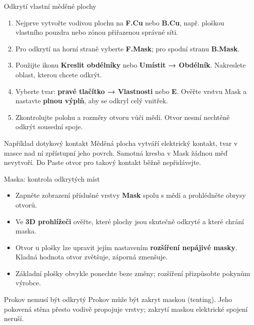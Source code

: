 \documentclass{beamer}
\begin{document}
\begin{frame}[t]{Odkrytí vlastní měděné plochy}
	\small
	\begin{enumerate}
		\item Nejprve vytvořte vodivou plochu na \textbf{F.Cu} nebo \textbf{B.Cu}, např. ploškou vlastního pouzdra nebo zónou přiřazenou správné síti.
		\item Pro odkrytí na horní straně vyberte \textbf{F.Mask}; pro spodní stranu \textbf{B.Mask}.
		\item Použijte ikonu \textbf{Kreslit obdélníky} nebo \textbf{Umístit → Obdélník}. Nakreslete oblast, kterou chcete odkrýt.
		\item Vyberte tvar: \textbf{pravé tlačítko → Vlastnosti} nebo \textbf{E}. Ověřte vrstvu Mask a nastavte \textbf{plnou výplň}, aby se odkryl celý vnitřek.
		\item Zkontrolujte polohu a rozměry otvoru vůči mědi. Otvor nesmí nechtěně odkrýt sousední spoje.
	\end{enumerate}
	\begin{block}{Například dotykový kontakt}
	Měděná plocha vytváří elektrický kontakt, tvar v masce nad ní zpřístupní jeho povrch. Samotná kresba v Mask žádnou měď nevytvoří. Do Paste otvor pro takový kontakt běžně nepřidávejte.
	\end{block}
\end{frame}

\begin{frame}[t]{Maska: kontrola odkrytých míst}
	\begin{itemize}
		\item Zapněte zobrazení příslušné vrstvy \textbf{Mask} spolu s mědí a prohlédněte obrysy otvorů.
		\item Ve \textbf{3D prohlížeči} ověřte, které plochy jsou skutečně odkryté a které chrání maska.
		\item Otvor u plošky lze upravit jejím nastavením \textbf{rozšíření nepájivé masky}. Kladná hodnota otvor zvětšuje, záporná zmenšuje.
		\item Základní plošky obvykle ponechte beze změny; rozšíření přizpůsobte pokynům výrobce.
	\end{itemize}
	\begin{block}{Prokov nemusí být odkrytý}
	Prokov může být zakryt maskou (tenting). Jeho pokovená stěna přesto vodivě propojuje vrstvy; zakrytí maskou elektrické spojení neruší.
	\end{block}
\end{frame}
\end{document}

